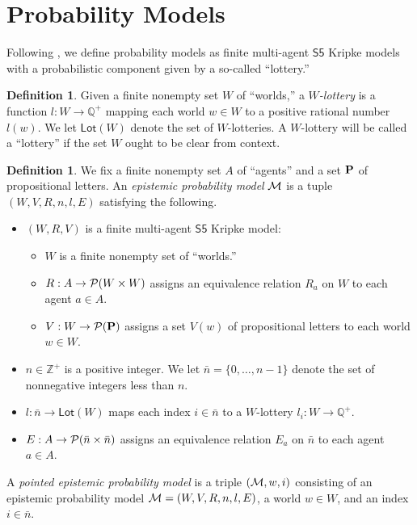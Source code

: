 \documentclass[12pt]{article}
\theoremstyle{definition}
\newtheorem{definition}[theorem]{Definition}
\newcommand{\Rat}{\mathbb{Q}}  %
\newcommand{\Int}{\mathbb{Z}}  %
\newcommand{\pow}{{\cal P}}    %
\newcommand{\M}{{\cal M}}      %
\newcommand{\Prop}{{\bf P}}    %
\begin{document}
\section{Probability Models}
\label{Section:EPL} 

Following \cite{Eijck2013:lap}, we define probability models as finite
multi-agent $\mathsf{S5}$ Kripke models with a probabilistic component
given by a so-called ``lottery.''

\begin{definition}
  Given a finite nonempty set $W$ of ``worlds,'' a \emph{$W$-lottery}
  is a function $l:W\to\Rat^+$ mapping each world $w\in W$ to a
  positive rational number $l(w)$.  We let $\mathsf{Lot}(W)$ denote
  the set of $W$-lotteries.  A $W$-lottery will be called a
  ``lottery'' if the set $W$ ought to be clear from context.
\end{definition}

\begin{definition}
  We fix a finite nonempty set $A$ of ``agents'' and a set $\Prop$ of
  propositional letters.  An \emph{epistemic probability model} $\M$
  is a tuple $(W,V,R,n,l,E)$ satisfying the following.
  \begin{itemize} 
  \item $(W,R,V)$ is a finite multi-agent $\mathsf{S5}$ Kripke model:
    \begin{itemize}
    \item $W$ is a finite nonempty set of ``worlds.''
      
    \item $R:A\to\pow(W\times W)$ assigns an equivalence relation $R_a$
      on $W$ to each agent $a\in A$.

    \item $V:W\to\pow(\Prop)$ assigns a set $V(w)$ of propositional
      letters to each world $w\in W$.
    \end{itemize}

  \item $n\in\Int^+$ is a positive integer.  We let
    $\bar{n}=\{0,\dots,n-1\}$ denote the set of nonnegative integers
    less than $n$.

  \item $l:\bar{n}\to\mathsf{Lot}(W)$ maps each index $i\in\bar{n}$ to
    a $W$-lottery $l_i:W\to\Rat^+$.

  \item $E:A\to\pow(\bar{n}\times\bar{n})$ assigns an equivalence
    relation $E_a$ on $\bar{n}$ to each agent $a\in A$.
  \end{itemize}
  A \emph{pointed epistemic probability model} is a triple $(\M,w,i)$
  consisting of an epistemic probability model $\M=(W,V,R,n,l,E)$, a
  world $w\in W$, and an index $i\in\bar{n}$.
\end{definition}
\end{document}
